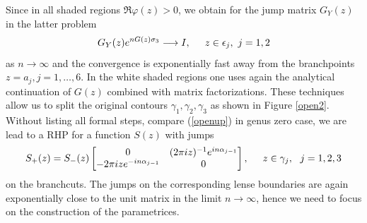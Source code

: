 \documentclass[10pt,oneside,reqno]{amsart}
\numberwithin{equation}{section}
\def\eqref#1{(\ref{#1})}
\begin{document}
Since in all  shaded regions $\Re\varphi(z)>0$, we obtain for the jump matrix $G_Y(z)$ in the latter problem 
\begin{equation}\label{esti3}
  G_Y(z)e^{nG(z)\sigma_3}\longrightarrow I,\hspace{0.5cm}z\in \epsilon_j,\ j=1,2
\end{equation}
as $n\rightarrow\infty$ and the convergence is exponentially fast away from the branchpoints $z=a_j,j=1,\ldots,6$. In the white shaded regions one uses again
the analytical continuation of $G(z)$ combined with matrix factorizations. These techniques allow us to split the original contours $\gamma_1,\gamma_2,\gamma_3$ as shown
in Figure \ref{open2}. Without listing all formal steps, compare \eqref{openup} in genus zero case, we are lead to a RHP for a function $S(z)$ with jumps
\begin{equation*}
  S_+(z)=S_-(z)\begin{bmatrix}
                            0 & (2\pi iz)^{-1}e^{in\alpha_{j-1}}\\
-2\pi iz e^{-in\alpha_{j-1}}& 0\\
                           \end{bmatrix},\hspace{0.5cm}z\in \gamma_j,\ \ j=1,2,3
\end{equation*}
on the branchcuts. The jumps on the corresponding lense boundaries are again exponentially close to the unit matrix in the limit $n\rightarrow\infty$, hence we need to focus
on the construction of the parametrices.\bigskip
\end{document}

